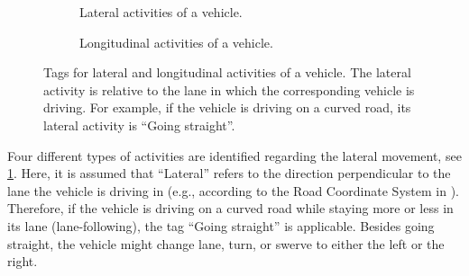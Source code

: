 \begin{figure}
	\centering
	\begin{subfigure}{\linewidth}
		\centering
		\caption{Lateral activities of a vehicle.}
		\label{fig:tree vehicle lat act}
	\end{subfigure}
	\begin{subfigure}{\linewidth}
		\centering
		\caption{Longitudinal activities of a vehicle.}
		\label{fig:tree vehicle long act}
	\end{subfigure}
	\caption{Tags for lateral and longitudinal activities of a vehicle. The lateral activity is relative to the lane in which the corresponding vehicle is driving. For example, if the vehicle is driving on a curved road, its lateral activity is ``Going straight''.}
	\label{fig:tree vehicle activities}
\end{figure}

Four different types of activities are identified regarding the lateral movement, see \cref{fig:tree vehicle lat act}. Here, it is assumed that ``Lateral'' refers to the direction perpendicular to the lane the vehicle is driving in (e.g., according to the Road Coordinate System in \cite{zofka2015datadrivetrafficscenarios}). Therefore, if the vehicle is driving on a curved road while staying more or less in its lane (lane-following), the tag ``Going straight'' is applicable. \cbstart Besides going straight, the vehicle might change lane, turn, or swerve to either the left or the right.\cbend


